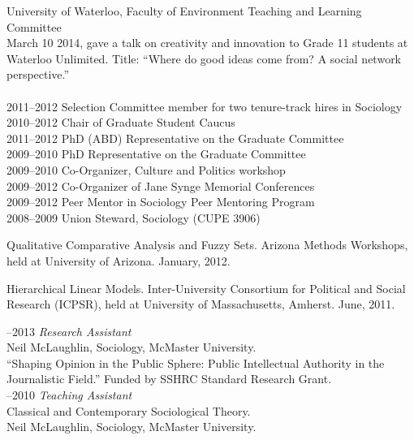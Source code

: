 \documentclass[9pt,usenames,dvipsnames]{article}
\begin{document}
 University of Waterloo, Faculty of Environment Teaching and Learning Committee \\

\ind March 10 2014, gave a talk on creativity and innovation to Grade 11 students at Waterloo Unlimited. Title: ``Where do good ideas come from? A social network perspective.'' \\

\\
2011–2012 Selection Committee member for two tenure-track hires in Sociology\\
2010–2012 Chair of Graduate Student Caucus\\
2011–2012 PhD (ABD) Representative on the Graduate Committee\\
2009–2010 PhD Representative on the Graduate Committee\\
2009–2010 Co-Organizer, Culture and Politics workshop\\
2009–2012 Co-Organizer of Jane Synge Memorial Conferences\\
2009–2012 Peer Mentor in Sociology Peer Mentoring Program\\
2008–2009 Union Steward, Sociology (CUPE 3906)\\



\ind Qualitative Comparative Analysis and Fuzzy Sets. Arizona Methods Workshops, held at University of Arizona. January, 2012.

\ind Hierarchical Linear Models. Inter-University Consortium for Political and Social Research (ICPSR), held at University of Massachusetts, Amherst. June, 2011.\\


–2013 {\it Research Assistant}\\
Neil McLaughlin, Sociology, McMaster University.\\ 
``Shaping Opinion in the Public Sphere: Public Intellectual Authority in the Journalistic Field.'' Funded by SSHRC Standard Research Grant.\\

–2010 {\it Teaching Assistant}\\
Classical and Contemporary Sociological Theory.\\
Neil McLaughlin, Sociology, McMaster University.\\
\end{document}
